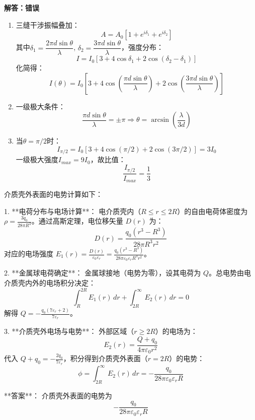 \documentclass{article}
\begin{document}
\begin{enumerate}[label=\arabic*.]
    \textbf{解答：错误}
    \begin{enumerate}
        \item 三缝干涉振幅叠加：
        $$
        A = A_0 \left[ 1 + e^{i\delta_1} + e^{i\delta_2} \right]
        $$
        其中$\delta_1 = \dfrac{2\pi d \sin\theta}{\lambda}$, $\delta_2 = \dfrac{3\pi d \sin\theta}{\lambda}$，强度分布：
        $$
        I = I_0 \left[ 3 + 4\cos\delta_1 + 2\cos(\delta_2 - \delta_1) \right]
        $$
        化简得：
        $$
        I(\theta) = I_0 \left[ 3 + 4\cos\left(\dfrac{\pi d \sin\theta}{\lambda}\right) + 2\cos\left(\dfrac{3\pi d \sin\theta}{\lambda}\right) \right]
        $$
        \item 一级极大条件：
        $$
        \dfrac{\pi d \sin\theta}{\lambda} = \pm \pi \Rightarrow \theta = \arcsin\left( \dfrac{\lambda}{3d} \right)
        $$
        \item 当$\theta = \pi/2$时：
        $$
        I_{\pi/2} = I_0 [3 + 4\cos(\pi/2) + 2\cos(3\pi/2)] = 3I_0
        $$
        一级极大强度$I_{max} = 9I_0$，故比值：
        $$
        \dfrac{I_{\pi/2}}{I_{max}} = \dfrac{1}{3}
        $$
    \end{enumerate}
\end{enumerate}

介质壳外表面的电势计算如下：

1. **电荷分布与电场计算**：  
   电介质壳内（\( R \leq r \leq 2R \)）的自由电荷体密度为 \(\rho = \frac{3q_0}{28\pi R^3}\)。通过高斯定理，电位移矢量 \( D(r) \) 为：  
   \[
   D(r) = \frac{q_0 (r^3 - R^3)}{28\pi R^3 r^2}
   \]  
   对应的电场强度 \( E_1(r) = \frac{D(r)}{\varepsilon_0 \varepsilon_r} = \frac{q_0 (r^3 - R^3)}{28\pi \varepsilon_0 \varepsilon_r R^3 r^2} \)。

2. **金属球电荷确定**：  
   金属球接地（电势为零），设其电荷为 \( Q \)。总电势由电介质壳内外的电场积分决定：  
   \[
   \int_R^{2R} E_1(r) \, dr + \int_{2R}^\infty E_2(r) \, dr = 0
   \]  
   解得 \( Q = -\frac{q_0 (7\varepsilon_r + 2)}{7\varepsilon_r} \)。

3. **介质壳外电场与电势**：  
   外部区域（\( r \geq 2R \)）的电场为：  
   \[
   E_2(r) = \frac{Q + q_0}{4\pi \varepsilon_0 r^2}
   \]  
   代入 \( Q + q_0 = -\frac{2q_0}{7\varepsilon_r} \)，积分得到介质壳外表面（\( r = 2R \)）的电势：  
   \[
   \phi = \int_{2R}^\infty E_2(r) \, dr = -\frac{q_0}{28\pi \varepsilon_0 \varepsilon_r R}
   \]

**答案**：  
介质壳外表面的电势为  
\[
\boxed{-\dfrac{q_0}{28\pi \varepsilon_0 \varepsilon_r R}}
\]
\end{document}
